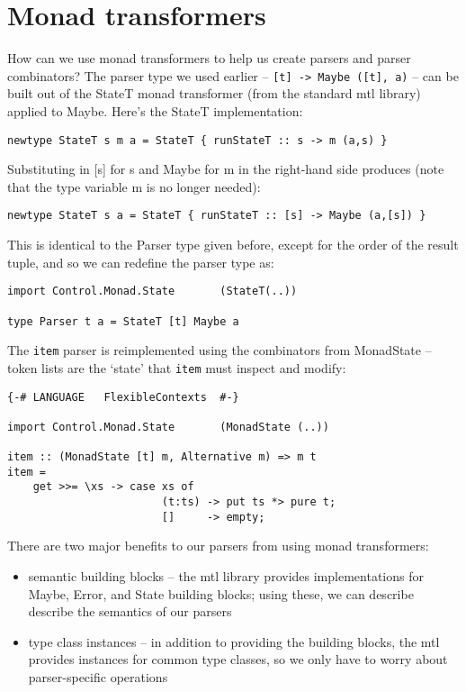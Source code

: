 \documentclass{tmr}
\begin{document}
\section{Monad transformers}

How can we use monad transformers to help us create parsers and parser combinators?
The parser type we used earlier -- \verb+[t] -> Maybe ([t], a)+
-- can be built out of the StateT monad transformer (from the standard 
mtl \cite{mtl} library) applied to Maybe.  Here's the StateT implementation:
\begin{verbatim}
newtype StateT s m a = StateT { runStateT :: s -> m (a,s) }
\end{verbatim}

Substituting in [s] for s and Maybe for m in the right-hand side produces
(note that the type variable m is no longer needed):
\begin{verbatim}
newtype StateT s a = StateT { runStateT :: [s] -> Maybe (a,[s]) }
\end{verbatim}

This is identical to the Parser type given before, except for the order 
of the result tuple, and so we can redefine the parser type as:
\begin{verbatim}
import Control.Monad.State       (StateT(..))

type Parser t a = StateT [t] Maybe a
\end{verbatim}

The \verb+item+ parser is reimplemented using the combinators from MonadState --
token lists are the `state' that \verb+item+ must inspect and modify:
\begin{verbatim}
{-# LANGUAGE   FlexibleContexts  #-}

import Control.Monad.State       (MonadState (..))

item :: (MonadState [t] m, Alternative m) => m t
item =
    get >>= \xs -> case xs of
                        (t:ts) -> put ts *> pure t;
                        []     -> empty;
\end{verbatim}

There are two major benefits to our parsers from using monad transformers:
\begin{itemize}
 \item semantic building blocks -- the mtl library provides implementations
    for Maybe, Error, and State building blocks; using these, we can describe
    describe the semantics of our parsers
 \item type class instances -- in addition to providing the building blocks,
    the mtl provides instances for common type classes, so we only have to 
    worry about parser-specific operations
\end{itemize}
\end{document}
